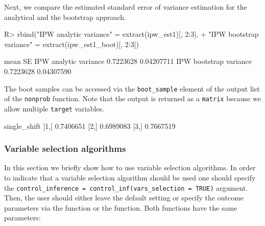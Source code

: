 \documentclass[
]{jss}
\begin{document}
Next, we compare the estimated standard error of variance estimation for
the analytical and the bootstrap approach.

\begin{CodeChunk}
\begin{CodeInput}
R> rbind("IPW analytic variance"  = extract(ipw_est1)[, 2:3],
+       "IPW bootstrap variance" = extract(ipw_est1_boot)[, 2:3])
\end{CodeInput}
\begin{CodeOutput}
                            mean         SE
IPW analytic variance  0.7223628 0.04207711
IPW bootstrap variance 0.7223628 0.04307590
\end{CodeOutput}
\end{CodeChunk}

The boot samples can be accessed via the \texttt{boot\_sample} element
of the output list of the \texttt{nonprob} function. Note that the
output is returned as a \texttt{matrix} because we allow multiple
\texttt{target} variables.

\begin{CodeChunk}
\begin{CodeOutput}
     single_shift
[1,]    0.7406651
[2,]    0.6989083
[3,]    0.7667519
\end{CodeOutput}
\end{CodeChunk}

\subsubsection{Variable selection
algorithms}\label{variable-selection-algorithms}

In this section we briefly show how to use variable selection
algorithms. In order to indicate that a variable selection algorithm
should be used one should specify the
\texttt{control\_inference\ =\ control\_inf(vars\_selection\ =\ TRUE)}
argument. Then, the user should either leave the default setting or
specify the outcome parameters via the  function or
the  function. Both functions have the same
parameters:
\end{document}
